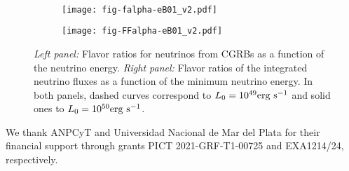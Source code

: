 \documentclass[baaa]{baaa}
\begin{document}
\begin{figure*}[!h]
\centering
\  \centering
    \begin{subfigure}[t]{0.47\textwidth}
        \centering                          
        \texttt{[image: fig-falpha-eB01\_v2.pdf]} 
    \end{subfigure}
    \hfill
    \begin{subfigure}[t]{0.47\textwidth}
        \centering
        \texttt{[image: fig-FFalpha-eB01\_v2.pdf]} 
    \end{subfigure}
%    
\caption{\emph{Left panel:} Flavor ratios for neutrinos from CGRBs as a function of the neutrino energy. \emph{Right panel:} Flavor ratios of the integrated neutrino fluxes as a function of the minimum neutrino energy. In both panels, dashed curves correspond to $L_0=10^{49}{\rm erg\ s^{-1}}$ and solid ones to $L_0=10^{50}{\rm erg\ s^{-1}}$.}
\label{fig:fFalpha}
\end{figure*}
%

%
\begin{acknowledgement}
 We thank ANPCyT and Universidad Nacional de Mar del Plata for their financial support through grants PICT 2021-GRF-T1-00725 and EXA1214/24, respectively.
\end{acknowledgement}



\small

 
\end{document}
